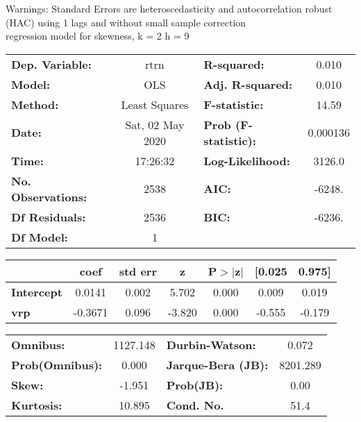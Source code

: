 Warnings: \newline
 [1] Standard Errors are heteroscedasticity and autocorrelation robust (HAC) using 1 lags and without small sample correction\\ 

regression model for skewness, k = 2 h = 9\begin{center}
\begin{tabular}{lclc}
\toprule
\textbf{Dep. Variable:}    &       rtrn       & \textbf{  R-squared:         } &     0.010   \\
\textbf{Model:}            &       OLS        & \textbf{  Adj. R-squared:    } &     0.010   \\
\textbf{Method:}           &  Least Squares   & \textbf{  F-statistic:       } &     14.59   \\
\textbf{Date:}             & Sat, 02 May 2020 & \textbf{  Prob (F-statistic):} &  0.000136   \\
\textbf{Time:}             &     17:26:32     & \textbf{  Log-Likelihood:    } &    3126.0   \\
\textbf{No. Observations:} &        2538      & \textbf{  AIC:               } &    -6248.   \\
\textbf{Df Residuals:}     &        2536      & \textbf{  BIC:               } &    -6236.   \\
\textbf{Df Model:}         &           1      & \textbf{                     } &             \\
\bottomrule
\end{tabular}
\begin{tabular}{lcccccc}
                   & \textbf{coef} & \textbf{std err} & \textbf{z} & \textbf{P$> |$z$|$} & \textbf{[0.025} & \textbf{0.975]}  \\
\midrule
\textbf{Intercept} &       0.0141  &        0.002     &     5.702  &         0.000        &        0.009    &        0.019     \\
\textbf{vrp}       &      -0.3671  &        0.096     &    -3.820  &         0.000        &       -0.555    &       -0.179     \\
\bottomrule
\end{tabular}
\begin{tabular}{lclc}
\textbf{Omnibus:}       & 1127.148 & \textbf{  Durbin-Watson:     } &    0.072  \\
\textbf{Prob(Omnibus):} &   0.000  & \textbf{  Jarque-Bera (JB):  } & 8201.289  \\
\textbf{Skew:}          &  -1.951  & \textbf{  Prob(JB):          } &     0.00  \\
\textbf{Kurtosis:}      &  10.895  & \textbf{  Cond. No.          } &     51.4  \\
\bottomrule
\end{tabular}
\end{center}

